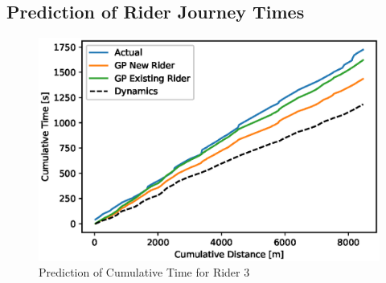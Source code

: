 \subsection{Prediction of Rider Journey Times} %

\label{appendix:new_rider_cum_time} %



\begin{figure}[h!]
\centering

  \centering
        \includegraphics[width=\textwidth]{images/GP_TestRide/Combined/OD_Cumulative_Time.eps}
        
        \caption{Prediction of Cumulative Time for Rider 3}
        \label{fig:od_fleet_cum_time}
\end{figure}

